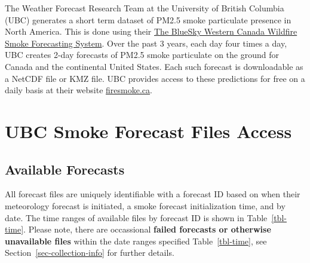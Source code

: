 \documentclass[
  letterpaper,
  DIV=11,
  numbers=noendperiod]{scrreprt}
\begin{document}
The Weather Forecast Research Team at the University of British Columbia
(UBC) generates a short term dataset of PM2.5 smoke particulate presence
in North America. This is done using their
\href{https://firesmoke.ca/resources/bsc-2014-description.pdf}{The
BlueSky Western Canada Wildfire Smoke Forecasting System}. Over the past
3 years, each day four times a day, UBC creates 2-day forecasts of PM2.5
smoke particulate on the ground for Canada and the continental United
States. Each such forecast is downloadable as a NetCDF file or KMZ file.
UBC provides access to these predictions for free on a daily basis at
their website \href{https://firesmoke.ca/}{firesmoke.ca}.

\section{UBC Smoke Forecast Files
Access}\label{ubc-smoke-forecast-files-access}

\subsection{Available Forecasts}\label{available-forecasts}

All forecast files are uniquely identifiable with a forecast ID based on
when their meteorology forecast is initiated, a smoke forecast
initialization time, and by date. The time ranges of available files by
forecast ID is shown in Table~\ref{tbl-time}. Please note, there are
occassional \textbf{failed forecasts or otherwise unavailable files}
within the date ranges specified Table~\ref{tbl-time}, see
Section~\ref{sec-collection-info} for further details.
\end{document}
